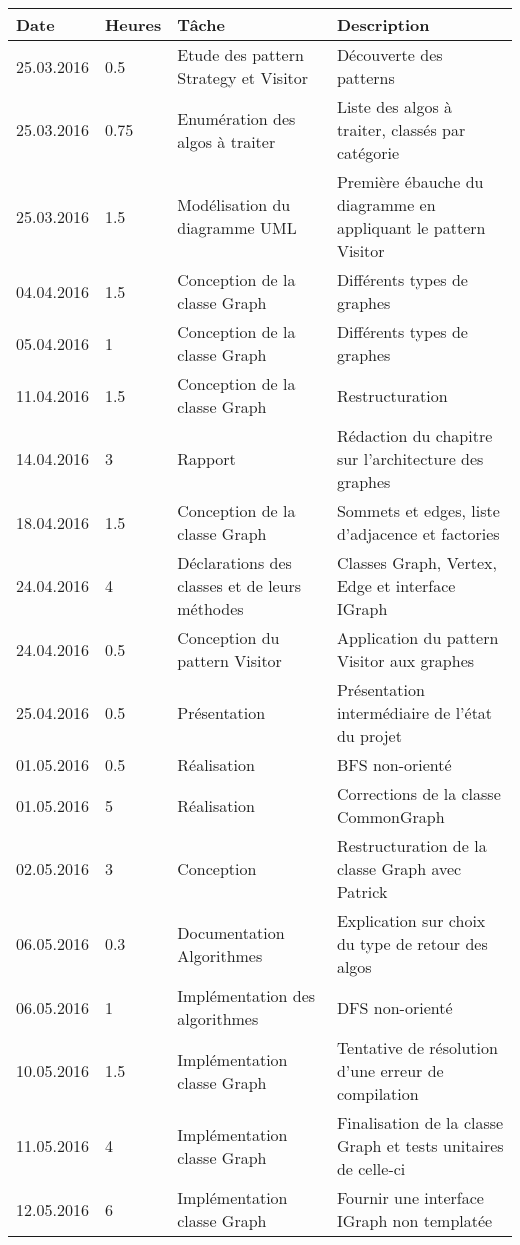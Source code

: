 \documentclass[french]{article}
\begin{document}
	\begin{tabular}{p{}|p{}|p{}|p{}}
		Date&Heures&Tâche&Description\\
		\hline \hline
		25.03.2016&0.5&Etude des pattern Strategy et Visitor&Découverte des patterns\\
		25.03.2016&0.75&Enumération des algos à traiter&Liste des algos à traiter, classés par catégorie\\
		25.03.2016&1.5&Modélisation du diagramme UML&Première ébauche du diagramme en appliquant le pattern Visitor\\
		\hline
		04.04.2016&1.5&Conception de la classe Graph&Différents types de graphes\\
		05.04.2016&1&Conception de la classe Graph&Différents types de graphes\\
		\hline
		11.04.2016&1.5&Conception de la classe Graph&Restructuration\\
		\hline
		14.04.2016&3&Rapport&Rédaction du chapitre sur l'architecture des graphes\\
		\hline
		18.04.2016&1.5&Conception de la classe Graph&Sommets et edges, liste d'adjacence et factories\\
		24.04.2016&4&Déclarations des classes et de leurs méthodes&Classes Graph, Vertex, Edge et interface IGraph\\
		24.04.2016&0.5&Conception du pattern Visitor&Application du pattern Visitor aux graphes\\
		\hline
		25.04.2016 & 0.5 & Présentation & Présentation intermédiaire de l'état du projet\\
		01.05.2016 & 0.5 & Réalisation & BFS non-orienté\\
		01.05.2016 & 5 & Réalisation & Corrections de la classe CommonGraph\\
		\hline
		02.05.2016 & 3 & Conception & Restructuration de la classe Graph avec Patrick\\
		06.05.2016 & 0.3 & Documentation Algorithmes & Explication sur choix du type de retour des algos\\
		06.05.2016 & 1 & Implémentation des algorithmes & DFS non-orienté\\
		\hline
		10.05.2016 & 1.5 & Implémentation classe Graph & Tentative de résolution d'une erreur de compilation\\
		11.05.2016 & 4 & Implémentation classe Graph & Finalisation de la classe Graph et tests unitaires de celle-ci \\
		12.05.2016 & 6 & Implémentation classe Graph & Fournir une interface IGraph non templatée \\

\end{tabular}
\end{document}
